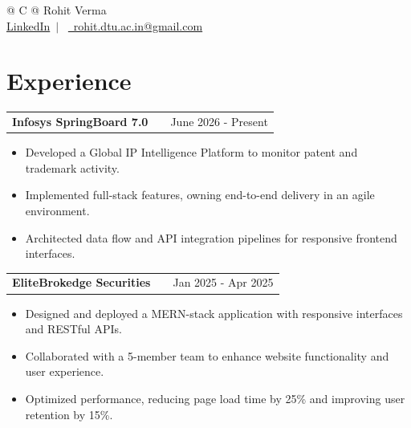 \documentclass[a4paper,10pt]{article}
\makeatletter
\newenvironment{joblong}[2]
    {
    \begin{tabularx}{\linewidth}{@{}l X r@{}}
    \textbf{#1} & \hfill &  #2 \\[3.75pt]
    \end{tabularx}
    \begin{minipage}[t]{\linewidth}
    \begin{itemize}[nosep,after=\strut, leftmargin=1em, itemsep=3pt,label=--]
    }
    {
    \end{itemize}
    \end{minipage}    
    }
\makeatother
\begin{document}
\pagestyle{empty} 


\newcommand{\name}{Rohit Verma}
\newcommand{\emaila}{rohit.dtu.ac.in@gmail.com}
\newcommand{\linkedin}{\href{https://linkedin.com/in/rohit-verma-211rv}{LinkedIn}}

\begin{tabularx}{\linewidth}{@{} C @{}}
\Huge{\name}\\[7.5pt]

\linkedin \ $|$ \
\href{mailto:\emaila}{\raisebox{-0.05\height}\faEnvelope\ \emaila}
\end{tabularx}


\section{Experience}


\begin{joblong}{Infosys SpringBoard 7.0}{June 2026 - Present}
\textit{Python Developer Intern}\\[3pt]
\item Developed a Global IP Intelligence Platform to monitor patent and trademark activity.
\item Implemented full-stack features, owning end-to-end delivery in an agile environment.
\item Architected data flow and API integration pipelines for responsive frontend interfaces.
\end{joblong}
\vspace{3pt}


\begin{joblong}{EliteBrokedge Securities}{Jan 2025 - Apr 2025}
\textit{Web Developer Intern}\\[3pt]
\item Designed and deployed a MERN-stack application with responsive interfaces and RESTful APIs.
\item Collaborated with a 5-member team to enhance website functionality and user experience.
\item Optimized performance, reducing page load time by 25\% and improving user retention by 15\%.
\end{joblong}
\vspace{3pt}
\end{document}
